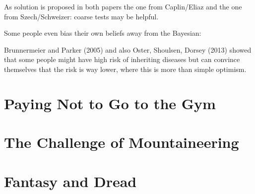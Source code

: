 As solution is proposed in both papers the one from Caplin/Eliaz and the one from Szech/Schweizer: coarse tests may be helpful.
~\newline

Some people even bias their own beliefs away from the Bayesian:
 
Brunnermeier and Parker (2005) and also Oster, Shoulsen, Dorsey (2013) showed that some people might have high risk of inheriting diseases but can convince themselves that the risk is way lower, where this is more than simple optimism.

\section{Paying Not to Go to the Gym}
\section{The Challenge of Mountaineering}
\section{Fantasy and Dread}

